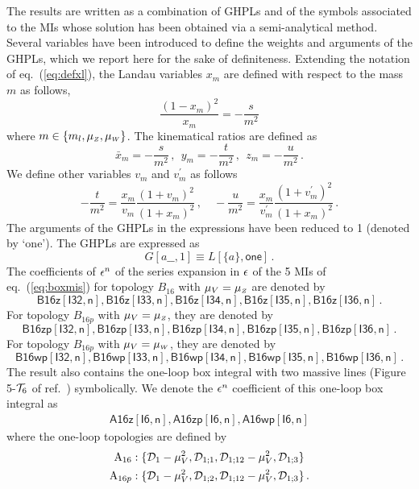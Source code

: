 \documentclass[11pt,a4paper]{article}
\begin{document}
The results are written as a combination of GHPLs and of the symbols associated
to the MIs whose solution has been obtained via a semi-analytical method.
Several variables have been introduced to define the weights and arguments of the GHPLs,
which we report here for the sake of definiteness.
%
Extending the notation of eq.~(\ref{eq:defxl}),
the Landau variables $x_m$ are defined with respect to the mass $m$ as follows,
\begin{equation}
  \frac{(1-x_m)^2}{x_m} = -\frac{s}{m^2}
  \label{eq:defxm}
\end{equation}
where $m \in \{ m_l, \mu_{\scriptscriptstyle Z}, \mu_{\scriptscriptstyle W} \}$.
The kinematical ratios are defined as
\begin{equation}
  \bar{x}_m = -\frac{s}{m^2}   \,, ~~
 y_m =  -\frac{t}{m^2}  \,, ~~
 z_m = -\frac{u}{m^2}  \,.
\end{equation}
%
We define other variables $v_m$ and $v_m^{'}$ as follows
\begin{equation}
 -\frac{t}{m^2} = \frac{x_m}{v_m} \frac{(1+v_m)^2}{(1+x_m)^2} \,, \quad
 -\frac{u}{m^2} = \frac{x_m}{v_m^{'}} \frac{(1+v_m^{'})^2}{(1+x_m)^2} \,.
\end{equation}
%
%
The arguments of the GHPLs in the expressions have been reduced to 1
(denoted by `\textsf{one}').
The GHPLs are expressed as
\begin{equation}
 G[a\_\_,1] \equiv L[\{a\}, \mathsf{one}] \,.
\end{equation}
%
The coefficients of $\epsilon^n$ of the series expansion in $\epsilon$ of the 5 MIs
of eq.~(\ref{eq:boxmis}) for topology $B_{16}$ with $\mu_V = \mu_{\scriptscriptstyle Z}$ are denoted
by
\begin{equation}
 \mathsf{B16z[I32,n]}, \mathsf{B16z[I33,n]}, \mathsf{B16z[I34,n]},
\mathsf{B16z[I35,n]}, \mathsf{B16z[I36,n]}\,.
\end{equation}
%
For topology $B_{16p}$ with $\mu_V = \mu_{\scriptscriptstyle Z}$, they are denoted by
\begin{equation}
 \mathsf{B16zp[I32,n]}, \mathsf{B16zp[I33,n]}, \mathsf{B16zp[I34,n]},
\mathsf{B16zp[I35,n]}, \mathsf{B16zp[I36,n]}\,.
\end{equation}
%
For topology $B_{16p}$ with $\mu_V = \mu_{\scriptscriptstyle W}$, they are denoted by
\begin{equation}
 \mathsf{B16wp[I32,n]}, \mathsf{B16wp[I33,n]}, \mathsf{B16wp[I34,n]},
\mathsf{B16wp[I35,n]}, \mathsf{B16wp[I36,n]}\,.
\end{equation}
%
%
The result also contains the one-loop box integral with two massive lines (Figure 5-${\cal T}_6$ of ref.~\cite{Bonciani:2016ypc}) symbolically.
We denote the $\epsilon^n$ coefficient of this one-loop box integral as
\begin{align}
 \mathsf{A16z[I6,n]}, \mathsf{A16zp[I6,n]}, \mathsf{A16wp[I6,n]}
\end{align}
where the one-loop topologies are defined by
\begin{align}
  {\rm A}_{16} &: \{ {\cal D}_1-\mu_V^2, {\cal D}_{1;1}, {\cal D}_{1;12}-\mu_V^2, {\cal D}_{1;3} \}
              \nonumber\\
  {\rm A}_{16p} &: \{ {\cal D}_1-\mu_V^2, {\cal D}_{1;2}, {\cal D}_{1;12}-\mu_V^2, {\cal D}_{1;3} \}\,.
\end{align}
%
%
\end{document}

